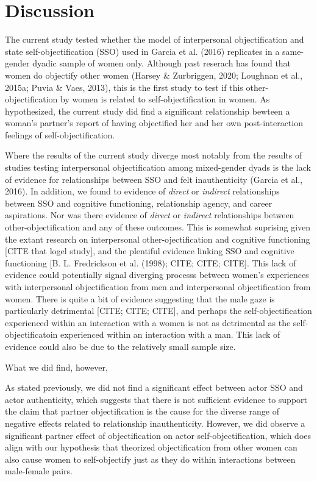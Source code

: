 \documentclass[man]{apa6}
\begin{document}
\section{Discussion}\label{discussion}

The current study tested whether the model of interpersonal
objectification and state self-objectification (SSO) used in Garcia et
al. (2016) replicates in a same-gender dyadic sample of women only.
Although past reserach has found that women do objectify other women
(Harsey \& Zurbriggen, 2020; Loughnan et al., 2015a; Puvia \& Vaes,
2013), this is the first study to test if this other-objectification by
women is related to self-objectification in women. As hypothesized, the
current study did find a significant relationship bewteen a woman's
partner's report of having objectified her and her own post-interaction
feelings of self-objectification.

Where the results of the current study diverge most notably from the
results of studies testing interpersonal objectification among
mixed-gender dyads is the lack of evidence for relationships between SSO
and felt inauthenticity (Garcia et al., 2016). In addition, we found to
evidence of \emph{direct} or \emph{indirect} relationships between SSO
and cognitive functioning, relationship agency, and career aspirations.
Nor was there evidence of \emph{direct} or \emph{indirect} relationships
between other-objectification and any of these outcomes. This is
somewhat suprising given the extant research on interpersonal
other-ojectification and cognitive functioning {[}CITE that logel
study{]}, and the plentiful evidence linking SSO and cognitive
functioning {[}B. L. Fredrickson et al. (1998); CITE; CITE; CITE{]}.
This lack of evidence could potentially signal diverging processs
between women's experiences with interpersonal objectification from men
and interpersonal objectification from women. There is quite a bit of
evidence suggesting that the male gaze is particularly detrimental
{[}CITE; CITE; CITE{]}, and perhaps the self-objectification experienced
within an interaction with a women is not as detrimental as the
self-objectificatoin experienced within an interaction with a man. This
lack of evidence could also be due to the relatively small sample size.

What we did find, however,

As stated previously, we did not find a significant effect between actor
SSO and actor authenticity, which suggests that there is not sufficient
evidence to support the claim that partner objectification is the cause
for the diverse range of negative effects related to relationship
inauthenticity. However, we did observe a significant partner effect of
objectification on actor self-objectification, which does align with our
hypothesis that theorized objectification from other women can also
cause women to self-objectify just as they do within interactions
between male-female pairs.
\end{document}

